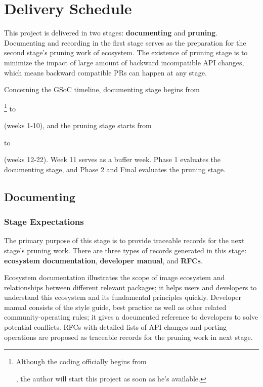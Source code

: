
\section{Delivery Schedule}\label{sec:delivery}

This project is delivered in two stages: \textbf{documenting} and \textbf{pruning}. Documenting and recording in the first stage serves as the preparation for the second stage's pruning work of \images{} ecosystem. The existence of pruning stage is to minimize the impact of large amount of backward incompatible API changes, which means backward compatible PRs can happen at any stage. \par

Concerning the GSoC timeline, documenting stage begins from \date{April 22}\footnote{Although the coding officially begins from \date{May 27}, the author will start this project as soon as he's available.} to \date{June 24} (weeks 1-10), and the pruning stage starts from \date{July 1} to \date{August 26} (weeks 12-22). Week 11 serves as a buffer week. \textsf{Phase 1} evaluates the documenting stage, and \textsf{Phase 2} and \textsf{Final} evaluates the pruning stage.

\subsection{Documenting}\label{subsec:documentation}

\subsubsection*{Stage Expectations}

The primary purpose of this stage is to provide traceable records for the next stage's pruning work. There are three types of records generated in this stage: \textbf{ecosystem documentation}, \textbf{developer manual}, and \textbf{RFCs}. \par

Ecosystem documentation illustrates the scope of image ecosystem and relationships between different relevant packages; it helps users and developers to understand this ecosystem and its fundamental principles quickly. Developer manual consists of the style guide, best practice as well as other related community-operating rules; it gives a documented reference to developers to solve potential conflicts. RFCs with detailed lists of API changes and porting operations are proposed as traceable records for the pruning work in next stage. \par

